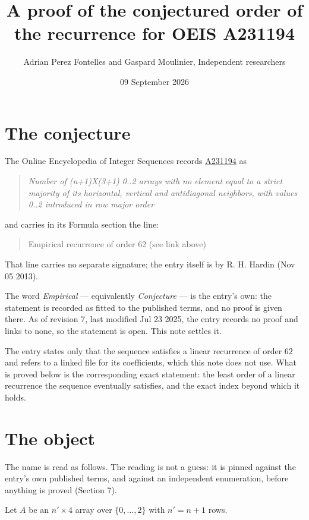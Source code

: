 \documentclass[11pt]{article}
\title{A proof of the conjectured order of the recurrence for OEIS A231194}
\author{Adrian Perez Fontelles and Gaspard Moulinier, Independent researchers}
\date{09 September 2026}
\theoremstyle{definition}
\begin{document}
\maketitle
\section{The conjecture}

The Online Encyclopedia of Integer Sequences records \href{https://oeis.org/A231194}{A231194} as

\begin{quote}\itshape Number of (n+1)X(3+1) 0..2 arrays with no element equal to a strict majority of its horizontal, vertical and antidiagonal neighbors, with values 0..2 introduced in row major order\end{quote}

and carries in its Formula section the line:

\begin{quote}\ttfamily Empirical recurrence of order 62 (see link above)\end{quote}

That line carries no separate signature; the entry itself is by R. H. Hardin (Nov 05 2013).

The word {\itshape Empirical} --- equivalently {\itshape Conjecture} --- is the entry's own: the statement is recorded as fitted to the published terms, and no proof is given there. As of revision 7, last modified Jul 23 2025, the entry records no proof and links to none, so the statement is open. This note settles it.

The entry states only that the sequence satisfies a linear recurrence of order $62$ and refers to a linked file for its coefficients, which this note does not use. What is proved below is the corresponding exact statement: the least order of a linear recurrence the sequence eventually satisfies, and the exact index beyond which it holds.

\section{The object}

The name is read as follows. The reading is not a guess: it is pinned against the entry's own published terms, and against an independent enumeration, before anything is proved (Section 7).

Let $A$ be an $n' \times 4$ array over $\{0,\dots,2\}$ with $n' = n + 1$ rows.
\end{document}
